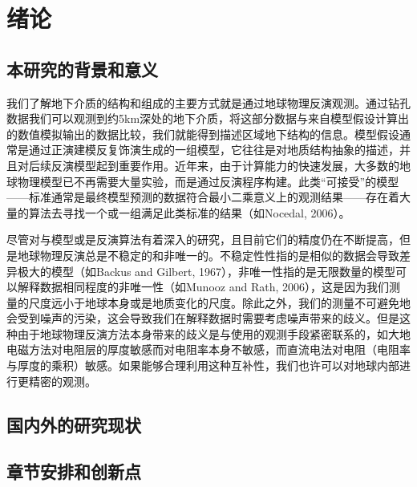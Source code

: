 \cleardoublepage

\section{绪论}

\subsection{本研究的背景和意义}

我们了解地下介质的结构和组成的主要方式就是通过地球物理反演观测。通过钻孔数据我们可以观测到约5km深处的地下介质，将这部分数据与来自模型假设计算出的数值模拟输出的数据比较，我们就能得到描述区域地下结构的信息。模型假设通常是通过正演建模反复饰演生成的一组模型，它往往是对地质结构抽象的描述，并且对后续反演模型起到重要作用。近年来，由于计算能力的快速发展，大多数的地球物理模型已不再需要大量实验，而是通过反演程序构建。此类“可接受”的模型——标准通常是最终模型预测的数据符合最小二乘意义上的观测结果——存在着大量的算法去寻找一个或一组满足此类标准的结果（如Nocedal, 2006）。

尽管对与模型或是反演算法有着深入的研究，且目前它们的精度仍在不断提高，但是地球物理反演总是不稳定的和非唯一的。不稳定性性指的是相似的数据会导致差异极大的模型（如Backus and Gilbert, 1967），非唯一性指的是无限数量的模型可以解释数据相同程度的非唯一性（如Munooz and Rath, 2006），这是因为我们测量的尺度远小于地球本身或是地质变化的尺度。除此之外，我们的测量不可避免地会受到噪声的污染，这会导致我们在解释数据时需要考虑噪声带来的歧义。但是这种由于地球物理反演方法本身带来的歧义是与使用的观测手段紧密联系的，如大地电磁方法对电阻层的厚度敏感而对电阻率本身不敏感，而直流电法对电阻（电阻率与厚度的乘积）敏感。如果能够合理利用这种互补性，我们也许可以对地球内部进行更精密的观测。

\subsection{国内外的研究现状}


\subsection{章节安排和创新点}

